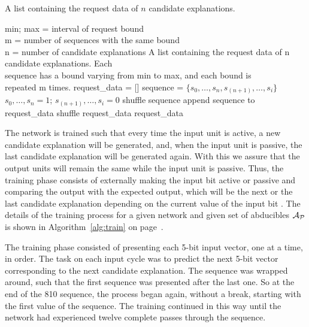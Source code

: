 \newpage
\vspace*{\fill}
\begin{tcolorbox}
\begin{algorithm}
\label{alg:request}
\normalfont
A list containing the request data of $n$ candidate explanations.
\begin{algorithmic}[1]
\REQUIRE min; max = interval of request bound\\
\hspace{0.5cm} m = number of sequences with the same bound\\
\hspace{0.5cm} n = number of candidate explanations
\ENSURE A list containing the request data of n candidate explanations. Each \\
\hspace{0.8cm} sequence has a bound varying from min to max, and each bound is \\
\hspace{0.8cm} repeated m times.
\bigskip
{}
\STATE request\_data = []
		\STATE sequence = $\{s_0,\dots,s_n,s_{(n+1)},\dots,s_i\}$
		\STATE $s_0,\dots,s_n = 1$; $s_{(n+1)},\dots,s_i = 0$
		\STATE shuffle sequence
		\STATE append sequence to request\_data
	\ENDFOR
\ENDFOR
\STATE shuffle request\_data
\RETURN request\_data
\ENDWHILE
\end{algorithmic}
\end{algorithm}
\end{tcolorbox}
\vspace*{\fill}
\newpage

The network is trained such that every time the input unit \Next is active, a new candidate explanation will be generated, and, when the input unit \Next is passive, the last candidate explanation will be generated again. With this we assure that the output units will remain the same while the input unit \Next is passive. Thus, the training phase consists of externally making the input bit \Next active or passive and comparing the output with the expected output, which will be the next or the last candidate explanation depending on the current value of the input bit \Next. The details of the training process for a given network and given set of abducibles $\mathcal{A}_{\mathcal{P}}$ is shown in Algorithm~\ref{alg:train} on page~\pageref{alg:train}.

The training phase consisted of presenting each 5-bit input vector, one at a time, in order. The task on each input cycle was to predict the next 5-bit vector corresponding to the next candidate explanation. The sequence was wrapped around, such that the first sequence was presented after the last one. So at the end of the 810 sequence, the process began again, without a break, starting with the first value of the sequence. The training continued in this way until the network had experienced twelve complete passes through the sequence. 


